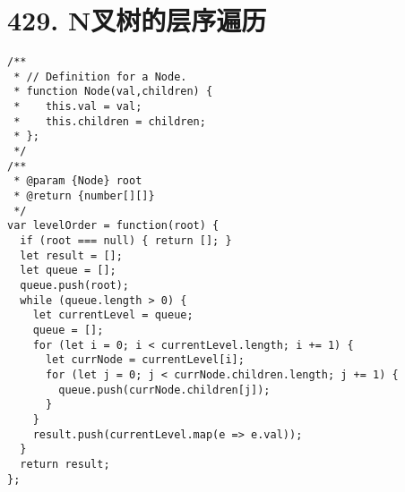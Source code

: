 \newpage
\section{429. N叉树的层序遍历}
\label{leetcode:429}

\begin{verbatim}
/**
 * // Definition for a Node.
 * function Node(val,children) {
 *    this.val = val;
 *    this.children = children;
 * };
 */
/**
 * @param {Node} root
 * @return {number[][]}
 */
var levelOrder = function(root) {
  if (root === null) { return []; }
  let result = [];
  let queue = [];
  queue.push(root);
  while (queue.length > 0) {
    let currentLevel = queue;
    queue = [];
    for (let i = 0; i < currentLevel.length; i += 1) {
      let currNode = currentLevel[i];
      for (let j = 0; j < currNode.children.length; j += 1) {
        queue.push(currNode.children[j]);
      }
    }
    result.push(currentLevel.map(e => e.val));
  }
  return result;
};
\end{verbatim}